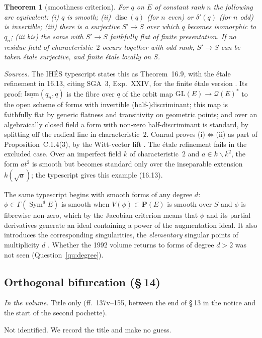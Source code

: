 \documentclass[11pt,a4paper]{amsart}
\newcommand{\Sym}{\operatorname{Sym}}
\newcommand{\GL}{\mathrm{GL}}
\newcommand{\Isom}{\operatorname{\underline{Isom}}}
\newcommand{\Pj}{\mathbf{P}}
\newcommand{\disc}{\operatorname{disc}}
\newcommand{\status}[1]{\par\smallskip\noindent\textit{In the volume.} #1\par\smallskip}
\theoremstyle{plain}
\newtheorem{theorem}{Theorem}[section]
\theoremstyle{definition}
\begin{document}
\begin{theorem}[smoothness criterion]\label{thm:smooth}
For $q$ on $E$ of constant rank $n$ the following are equivalent: (i) $q$ is smooth; (ii) $\disc(q)$ (for $n$ even) or $\delta'(q)$ (for $n$ odd) is invertible; (iii) there is a surjective $S'\to S$ over which $q$ becomes isomorphic to $q_n$; (iii bis) the same with $S'\to S$ faithfully flat of finite presentation. If no residue field of characteristic~$2$ occurs together with odd rank, $S'\to S$ can be taken étale surjective, and finite étale locally on $S$.
\end{theorem}

\noindent\emph{Sources.} The IHÉS typescript states this as Theorem~16.9, with the étale refinement in 16.13, citing SGA~3, Exp.~XXIV, for the finite étale version \cite{ihes, sga3}. Its proof: $\Isom(q_n,q)$ is the fibre over $q$ of the orbit map $\GL(E)\to\mathcal Q(E)^*$ to the open scheme of forms with invertible (half-)discriminant; this map is faithfully flat by generic flatness and transitivity on geometric points; and over an algebraically closed field a form with non-zero half-discriminant is standard, by splitting off the radical line in characteristic~$2$. Conrad proves (i)$\Leftrightarrow$(ii) as part of Proposition~C.1.4(3), by the Witt-vector lift \cite{conrad}. The étale refinement fails in the excluded case. Over an imperfect field $k$ of characteristic~$2$ and $a\in k\smallsetminus k^2$, the form $at^2$ is smooth but becomes standard only over the inseparable extension $k(\sqrt a)$; the typescript gives this example (16.13).

The same typescript begins with smooth forms of any degree $d$: $\phi\in\Gamma(\Sym^dE)$ is smooth when $V(\phi)\subset\Pj(E)$ is smooth over $S$ and $\phi$ is fibrewise non-zero, which by the Jacobian criterion means that $\phi$ and its partial derivatives generate an ideal containing a power of the augmentation ideal. It also introduces the corresponding singularities, the \emph{elementary} singular points of multiplicity $d$ \cite{ihes}. Whether the 1992 volume returns to forms of degree $d>2$ was not seen (Question~\ref{qu:degree}).

\subsection{Orthogonal bifurcation (\S\,14)}
\status{Title only (ff.~137v--155, between the end of \S\,13 in the notice and the start of the second pochette).}
Not identified. We record the title and make no guess.
\end{document}
